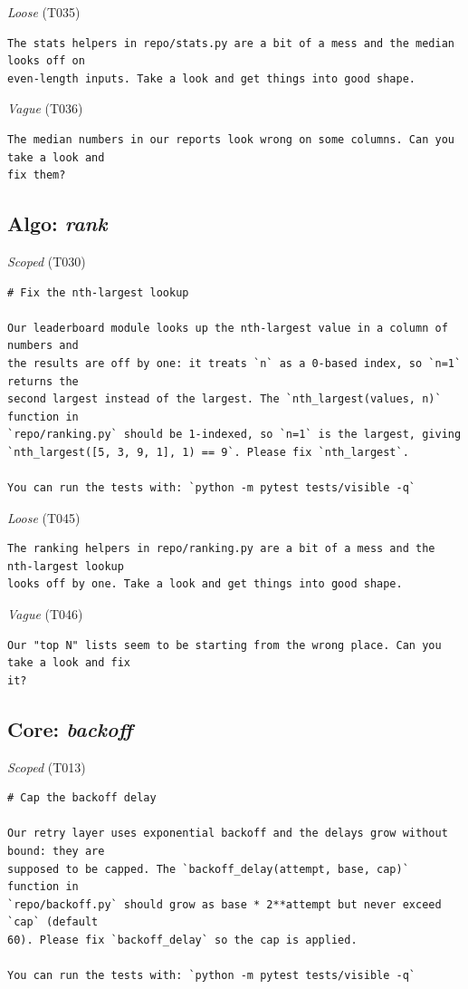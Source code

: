 \noindent\textit{Loose} (T035)
\begin{Verbatim}[fontsize=\footnotesize,frame=leftline,xleftmargin=1em]
The stats helpers in repo/stats.py are a bit of a mess and the median looks off on
even-length inputs. Take a look and get things into good shape.
\end{Verbatim}

\noindent\textit{Vague} (T036)
\begin{Verbatim}[fontsize=\footnotesize,frame=leftline,xleftmargin=1em]
The median numbers in our reports look wrong on some columns. Can you take a look and
fix them?
\end{Verbatim}

\subsection*{Algo: \emph{rank}}
\noindent\textit{Scoped} (T030)
\begin{Verbatim}[fontsize=\footnotesize,frame=leftline,xleftmargin=1em]
# Fix the nth-largest lookup

Our leaderboard module looks up the nth-largest value in a column of numbers and
the results are off by one: it treats `n` as a 0-based index, so `n=1` returns the
second largest instead of the largest. The `nth_largest(values, n)` function in
`repo/ranking.py` should be 1-indexed, so `n=1` is the largest, giving
`nth_largest([5, 3, 9, 1], 1) == 9`. Please fix `nth_largest`.

You can run the tests with: `python -m pytest tests/visible -q`
\end{Verbatim}

\noindent\textit{Loose} (T045)
\begin{Verbatim}[fontsize=\footnotesize,frame=leftline,xleftmargin=1em]
The ranking helpers in repo/ranking.py are a bit of a mess and the nth-largest lookup
looks off by one. Take a look and get things into good shape.
\end{Verbatim}

\noindent\textit{Vague} (T046)
\begin{Verbatim}[fontsize=\footnotesize,frame=leftline,xleftmargin=1em]
Our "top N" lists seem to be starting from the wrong place. Can you take a look and fix
it?
\end{Verbatim}

\subsection*{Core: \emph{backoff}}
\noindent\textit{Scoped} (T013)
\begin{Verbatim}[fontsize=\footnotesize,frame=leftline,xleftmargin=1em]
# Cap the backoff delay

Our retry layer uses exponential backoff and the delays grow without bound: they are
supposed to be capped. The `backoff_delay(attempt, base, cap)` function in
`repo/backoff.py` should grow as base * 2**attempt but never exceed `cap` (default
60). Please fix `backoff_delay` so the cap is applied.

You can run the tests with: `python -m pytest tests/visible -q`
\end{Verbatim}

